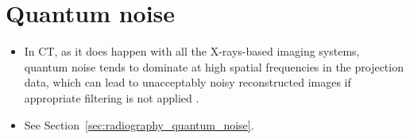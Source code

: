 \section{Quantum noise}
\begin{itemize}
\item In CT, as it does happen with all the X-rays-based imaging
  systems, quantum noise tends to dominate at high spatial frequencies
  in the projection data, which can lead to unacceptably noisy
  reconstructed images if appropriate filtering is not applied
  \cite{bushberg2011essential}.
\item See Section~\ref{sec:radiography_quantum_noise}.
\end{itemize}
